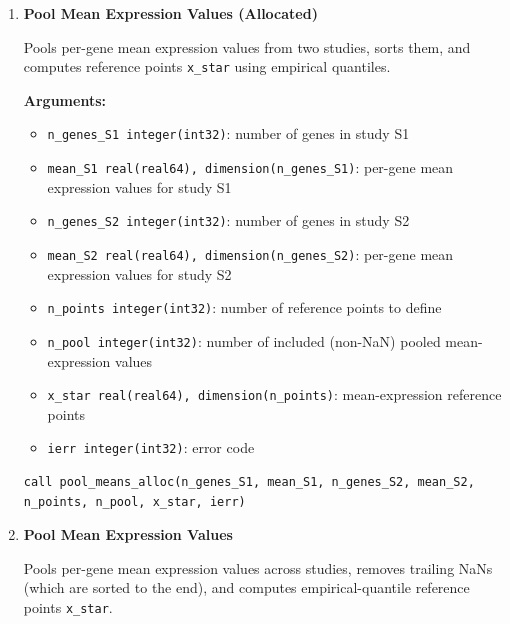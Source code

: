 \begin{enumerate}
    \item \textbf{Pool Mean Expression Values (Allocated)}

        Pools per-gene mean expression values from two studies, sorts them, and computes reference points \lstinline!x_star! using empirical quantiles.

        \textbf{Arguments:}
        \begin{itemize}
            \item \lstinline!n_genes_S1 integer(int32)!: number of genes in study S1
            \item \lstinline!mean_S1 real(real64), dimension(n_genes_S1)!: per-gene mean expression values for study S1
            \item \lstinline!n_genes_S2 integer(int32)!: number of genes in study S2
            \item \lstinline!mean_S2 real(real64), dimension(n_genes_S2)!: per-gene mean expression values for study S2
            \item \lstinline!n_points integer(int32)!: number of reference points to define
            \item \lstinline!n_pool integer(int32)!: number of included (non-NaN) pooled mean-expression values
            \item \lstinline!x_star real(real64), dimension(n_points)!: mean-expression reference points
            \item \lstinline!ierr integer(int32)!: error code
        \end{itemize}

        \begin{lstlisting}[caption={Pool Means (Allocated)}]
call pool_means_alloc(n_genes_S1, mean_S1, n_genes_S2, mean_S2, n_points, n_pool, x_star, ierr)
        \end{lstlisting}

    \item \textbf{Pool Mean Expression Values}

        Pools per-gene mean expression values across studies, removes trailing NaNs (which are sorted to the end), and computes empirical-quantile reference points \lstinline!x_star!.


\end{enumerate}
